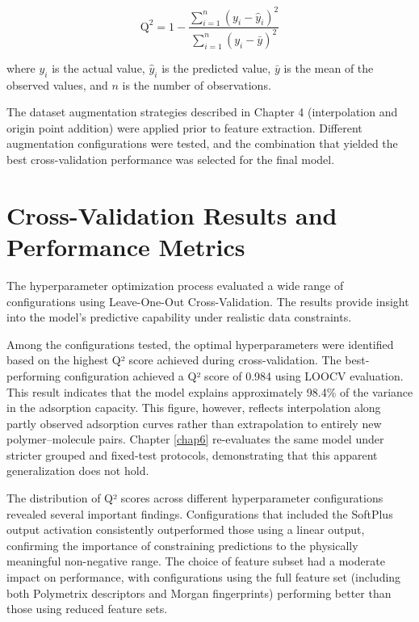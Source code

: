 \begin{equation}
\text{Q}^2 = 1 - \frac{\sum_{i=1}^{n}(y_i - \hat{y}_i)^2}{\sum_{i=1}^{n}(y_i - \bar{y})^2}
\end{equation}

where $y_i$ is the actual value, $\hat{y}_i$ is the predicted value, $\bar{y}$ is the mean of the observed values, and $n$ is the number of observations.

The dataset augmentation strategies described in Chapter 4 (interpolation and origin point addition) were applied prior to feature extraction. Different augmentation configurations were tested, and the combination that yielded the best cross-validation performance was selected for the final model.

\section{Cross-Validation Results and Performance Metrics}
\label{sec:cv_results}

The hyperparameter optimization process evaluated a wide range of configurations using Leave-One-Out Cross-Validation. The results provide insight into the model's predictive capability under realistic data constraints.

Among the configurations tested, the optimal hyperparameters were identified based on the highest Q² score achieved during cross-validation. The best-performing configuration achieved a Q² score of 0.984 using LOOCV evaluation. This result indicates that the model explains approximately 98.4\% of the variance in the adsorption capacity. This figure, however, reflects interpolation along partly observed adsorption curves rather than extrapolation to entirely new polymer--molecule pairs. Chapter \ref{chap6} re-evaluates the same model under stricter grouped and fixed-test protocols, demonstrating that this apparent generalization does not hold.

The distribution of Q² scores across different hyperparameter configurations revealed several important findings. Configurations that included the SoftPlus output activation consistently outperformed those using a linear output, confirming the importance of constraining predictions to the physically meaningful non-negative range. The choice of feature subset had a moderate impact on performance, with configurations using the full feature set (including both Polymetrix descriptors and Morgan fingerprints) performing better than those using reduced feature sets.


